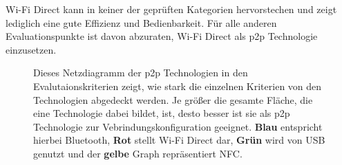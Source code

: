 		Wi-Fi Direct kann in keiner der geprüften Kategorien hervorstechen und zeigt lediglich eine gute Effizienz und Bedienbarkeit. Für alle anderen Evaluationspunkte ist davon abzuraten, Wi-Fi Direct als p2p Technologie einzusetzen.
		
    \begin{figure}[ht]
    \centering
    \caption[Netzdiagramm der p2p Technologien in den Evalutaionskriterien]{Dieses Netzdiagramm der p2p Technologien in den Evalutaionskriterien zeigt, wie stark die einzelnen Kriterien von den Technologien abgedeckt werden. Je größer die gesamte Fläche, die eine Technologie dabei bildet, ist, desto besser ist sie als p2p Technologie zur Vebrindungskonfiguration geeignet. {\bf Blau} entspricht hierbei Bluetooth, {\bf Rot} stellt Wi-Fi Direct dar, {\bf Grün} wird von USB genutzt und der {\bf gelbe} Graph repräsentiert NFC. } \label{fig:rating}
    \end{figure}